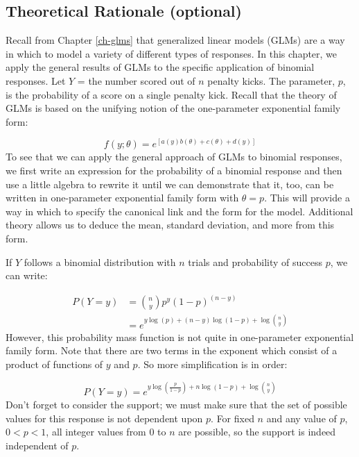 \documentclass[
]{krantz}
\begin{document}
\hypertarget{theoretical-rationale-optional}{%
\subsection{Theoretical Rationale (optional)}\label{theoretical-rationale-optional}}

Recall from Chapter \ref{ch-glms} that generalized linear models (GLMs)  are a way in which to model a variety of different types of responses. In this chapter, we apply the general results of GLMs to the specific application of binomial responses. Let \(Y\) = the number scored out of \(n\) penalty kicks. The parameter, \(p\), is the probability of a score on a single penalty kick. Recall that the theory of GLMs is based on the unifying notion of the one-parameter exponential family form:

\begin{equation*}
f(y;\theta)=e^{[a(y)b(\theta)+c(\theta)+d(y)]}
\end{equation*}
To see that we can apply the general approach of GLMs  to binomial responses, we first write an expression for the probability of a binomial response and then use a little algebra to rewrite it until we can demonstrate that it, too, can be written in one-parameter exponential family form with \(\theta = p\). This will provide a way in which to specify the canonical link and the form for the model. Additional theory allows us to deduce the mean, standard deviation, and more from this form.

If \(Y\) follows a binomial distribution with \(n\) trials and probability of success \(p\), we can write:

\begin{align*}
P(Y=y)&= \binom{n}{y}p^y(1-p)^{(n-y)} \\
      &=e^{y\log(p) + (n-y)\log(1-p) + \log\binom{n}{y}}
\end{align*}
However, this probability mass function is not quite in one-parameter exponential family form. Note that there are two terms in the exponent which consist of a product of functions of \(y\) and \(p\). So more simplification is in order:

\begin{equation*}
P(Y=y) = e^{y\log\left(\frac{p}{1-p}\right) + n\log(1-p)+ \log\binom{n}{y}}
\end{equation*}
Don't forget to consider the support; we must make sure that the set of possible values for this response is not dependent upon \(p\). For fixed \(n\) and any value of \(p\), \(0<p<1\), all integer values from \(0\) to \(n\) are possible, so the support is indeed independent of \(p\).
\end{document}
